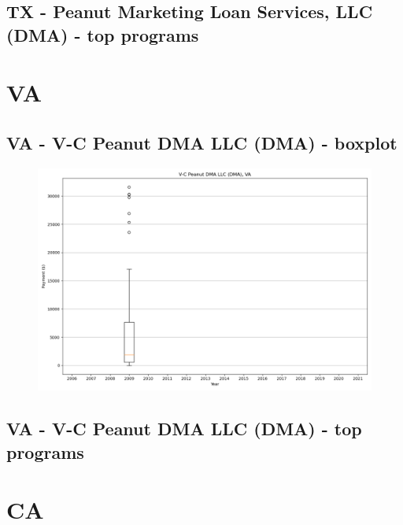 \subsection*{TX - Peanut Marketing Loan Services, LLC (DMA) - top programs}

\newpage
\section*{VA}
\subsection*{VA - V-C Peanut DMA LLC (DMA) - boxplot}
\begin{figure}[h]
\centering
\includegraphics[width=7in]{../output/boxplots/counties/V-C Peanut DMA LLC (DMA)-VA_boxplot.png}
\end{figure}


\subsection*{VA - V-C Peanut DMA LLC (DMA) - top programs}

\newpage
\section*{CA}

